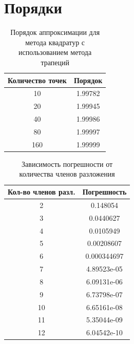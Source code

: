 \documentclass{article}
\begin{document}
	\section{Порядки}
		\begin{table}[H]
		\centering
		\caption{Порядок аппроксимации для метода квадратур с использованием метода трапеций}
		\begin{tabular}{|c|c|}
			\hline
			Количество точек & Порядок \\ \hline
			10 &1.99782\\ \hline
			20 &1.99945\\ \hline
			40 &1.99986\\ \hline
			80 &1.99997\\ \hline
			160 &1.99999\\ \hline
		\end{tabular}
	\end{table}

			\begin{table}[H]
		\centering
		\caption{Зависимость погрешности от количества членов разложения}
		\begin{tabular}{|c|c|}
			\hline
			Кол-во членов разл. & Погрешность \\ \hline
			2 &0.148054\\ \hline
			3 &0.0440627\\ \hline
			4 &0.0105949\\ \hline
			5 &0.00208607\\ \hline
			6 &0.000344697\\ \hline
			7 &4.89523e-05\\ \hline
			8 &6.09131e-06\\ \hline
			9 &6.73798e-07\\ \hline
			10 &6.65161e-08\\ \hline
			11 &5.35044e-09\\ \hline
			12 &6.04542e-10\\ \hline
		\end{tabular}
	\end{table}
\end{document}
